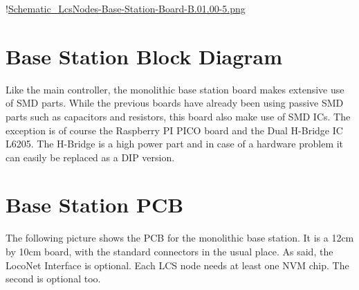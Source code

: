 !\href{./Schematics/Schematic_LcsNodes-Base-Station-Board-B.01.00-5.png }{Schematic_LcsNodes-Base-Station-Board-B.01.00-5.png}

\section{Base Station Block Diagram}
Like the main controller, the monolithic base station board makes extensive use of SMD parts. While the previous boards have already been using passive SMD parts such as capacitors and resistors, this board also make use of SMD ICs. The exception is of course the Raspberry PI PICO board and the Dual H-Bridge IC L6205. The H-Bridge is a high power part and in case of a hardware problem it can easily be replaced as a DIP version.

\section{Base Station PCB}

The following picture shows the PCB for the monolithic base station. It is a 12cm by 10cm board, with the standard connectors in the usual place. As said, the LocoNet Interface is optional. Each LCS node needs at least one NVM chip. The second is optional too.

\begin{figure}[h]
    \centering
\end{figure}


